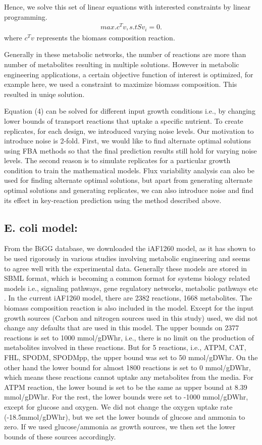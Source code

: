 \documentclass[12pt]{article}
\begin{document}
Hence, we solve this set of linear equations with interested constraints by linear programming.
\begin{align}
{max.} c^Tv, s. t Sv_{i}=0.
\end{align}
where $c^Tv$ represents the biomass composition reaction.

\bigskip
\noindent
Generally in these metabolic networks, the number of reactions are more than number of metabolites resulting in multiple solutions.  However in metabolic engineering applications, a certain objective function of interest is optimized, for example here, we used a constraint to maximize biomass composition. This resulted in uniqe solution. 

\bigskip
\noindent
Equation (4) can be solved for different input growth conditions i.e., by changing lower bounds of transport reactions that uptake a specific nutrient. To create replicates, for each design, we introduced varying noise levels. Our motivation to introduce noise is 2-fold. First, we would like to find alternate optimal solutions using FBA methods so that the final prediction results still hold for varying noise levels. The second reason is to simulate replicates for a particular growth condition to train the mathematical models. Flux variability analysis can also be used for finding alternate optimal solutions, but apart from generating alternate optimal solutions and generating replicates, we can also introduce noise and find its effect in key-reaction prediction using the method described above.

\subsection*{E. coli model:} 
From the BiGG database, we downloaded the iAF1260 model, as it has shown to be used rigorously in various studies involving metabolic engineering and seems to agree well with the experimental data. Generally these models are stored in SBML format, which is becoming a common format for systems biology related models i.e., signaling pathways, gene regulatory networks, metabolic pathways etc \cite{Huckaetal2003}. In the current iAF1260 model, there are 2382 reactions, 1668 metabolites. The biomass composition reaction is also included in the model. Except for the input growth sources (Carbon and nitrogen sources used in this study) used, we did not change any defaults that are used in this model. The upper bounds on 2377 reactions is set to 1000 mmol/gDWhr, i.e., there is no limit on the production of metabolites involved in these reactions. But for 5 reactions, i.e., ATPM, CAT, FHL, SPODM, SPODMpp, the upper bound was set to 50 mmol/gDWhr. On the other hand the lower bound for almost 1800 reactions is set to 0 mmol/gDWhr, which means these reactions cannot uptake any metabolites from the media. For ATPM reaction, the lower bound is set to be the same as upper bound at 8.39 mmol/gDWhr. For the rest, the lower bounds were set to -1000 mmol/gDWhr, except for glucose and oxygen. We did not change the oxygen uptake rate (-18.5mmol/gDWhr), but we set the lower bounds of glucose and ammonia to zero. If we used glucose/ammonia as growth sources, we then set the lower bounds of these sources accordingly.
\end{document}

